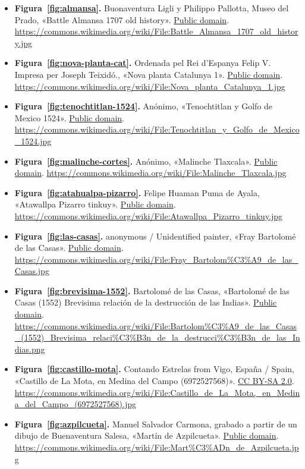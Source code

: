 \documentclass{book}
\begin{document}
\begin{itemize}
\item \textbf{Figura~\ref{fig:almansa}.} Buonaventura Ligli y Philippo Pallotta, Museo del Prado, «Battle Almansa 1707 old history». \href{https://creativecommons.org/publicdomain/mark/1.0/}{Public domain}. \url{https://commons.wikimedia.org/wiki/File:Battle_Almansa_1707_old_history.jpg}
\item \textbf{Figura~\ref{fig:nova-planta-cat}.} Ordenada pel Rei d'Espanya Felip V. Impresa per Joseph Teixidó., «Nova planta Catalunya 1». \href{https://creativecommons.org/publicdomain/mark/1.0/}{Public domain}. \url{https://commons.wikimedia.org/wiki/File:Nova_planta_Catalunya_1.jpg}
\item \textbf{Figura~\ref{fig:tenochtitlan-1524}.} Anónimo, «Tenochtitlan y Golfo de Mexico 1524». \href{https://creativecommons.org/publicdomain/mark/1.0/}{Public domain}. \url{https://commons.wikimedia.org/wiki/File:Tenochtitlan_y_Golfo_de_Mexico_1524.jpg}
\item \textbf{Figura~\ref{fig:malinche-cortes}.} Anónimo, «Malinche Tlaxcala». \href{https://creativecommons.org/publicdomain/mark/1.0/}{Public domain}. \url{https://commons.wikimedia.org/wiki/File:Malinche_Tlaxcala.jpg}
\item \textbf{Figura~\ref{fig:atahualpa-pizarro}.} Felipe Huaman Puma de Ayala, «Atawallpa Pizarro tinkuy». \href{https://creativecommons.org/publicdomain/mark/1.0/}{Public domain}. \url{https://commons.wikimedia.org/wiki/File:Atawallpa_Pizarro_tinkuy.jpg}
\item \textbf{Figura~\ref{fig:las-casas}.} anonymous / Unidentified painter, «Fray Bartolomé de las Casas». \href{https://creativecommons.org/publicdomain/mark/1.0/}{Public domain}. \url{https://commons.wikimedia.org/wiki/File:Fray_Bartolom%C3%A9_de_las_Casas.jpg}
\item \textbf{Figura~\ref{fig:brevisima-1552}.} Bartolomé de las Casas, «Bartolomé de las Casas (1552) Brevisima relación de la destrucción de las Indias». \href{https://creativecommons.org/publicdomain/mark/1.0/}{Public domain}. \url{https://commons.wikimedia.org/wiki/File:Bartolom%C3%A9_de_las_Casas_(1552)_Brevisima_relaci%C3%B3n_de_la_destrucci%C3%B3n_de_las_Indias.png}
\item \textbf{Figura~\ref{fig:castillo-mota}.} Contando Estrelas from Vigo, España / Spain, «Castillo de La Mota, en Medina del Campo (6972527568)». \href{https://creativecommons.org/licenses/by-sa/2.0/}{CC BY-SA 2.0}. \url{https://commons.wikimedia.org/wiki/File:Castillo_de_La_Mota,_en_Medina_del_Campo_(6972527568).jpg}
\item \textbf{Figura~\ref{fig:azpilcueta}.} Manuel Salvador Carmona, grabado a partir de un dibujo de Buenaventura Salesa, «Martín de Azpilcueta». \href{https://creativecommons.org/publicdomain/mark/1.0/}{Public domain}. \url{https://commons.wikimedia.org/wiki/File:Mart%C3%ADn_de_Azpilcueta.jpg}

\end{itemize}
\end{document}
